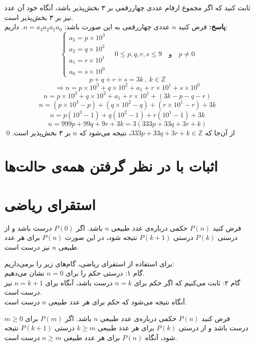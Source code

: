 \begin{example}
	ثابت کنید که اگر مجموع ارقام عددی چهاررقمی بر ۳ بخش‌پذیر باشد، آنگاه خود آن عدد نیز بر ۳ بخش‌پذیر است. \\
	\textbf{پاسخ:}
	فرض کنید $n$ عددی چهاررقمی به این صورت باشد:
	$n = a_3 a_2 a_1 a_0$.
	داریم:
	\[
	\begin{cases}
		a_3 = p \times 10^3 \\
		a_2 = q \times 10^2 \\
		a_1 = r \times 10^1 \\
		a_0 = s \times 10^0
	\end{cases}
	\quad
	0 \leq p, q, r, s \leq 9 \quad \text{و} \quad p \neq 0
	\]
	$$p+q+r+s = 3k \ , \ k \in \mathbb{Z}$$
	$$\Rightarrow n = p \times 10^3 +  q \times 10^2 + a_1 + r \times 10^1 + s \times 10^0$$
	$$n = p \times 10^3 +  q \times 10^2 + a_1 + r \times 10^1 + (3k-p-q-r)$$
	$$n = (p \times 10^3 -p) + (q \times 10^2 -q) + (r \times 10^1 -r) +3k$$
	$$n = p(10^3-1) + q(10^2-1) + r(10^1-1) +3k$$
	$$n = 999p +99q +9r +3k = 3(333p+33q+3r+k)$$
	از آن‌جا که
	$333p+33q+3r+k \in \mathbb{Z}$،
	نتیجه می‌شود که $n$ بر ۳ بخش‌پذیر است.
	\qed
\end{example}

\section{اثبات با در نظر گرفتن همه‌ی حالت‌ها}

\section{استقرای ریاضی}

\begin{theorem}
	فرض کنید
	$P(n)$
	حکمی درباره‌ی عدد طبیعی $n$ باشد. اگر
	$P(0)$
	درست باشد و از درستی
	$P(k)$
	درستی
	$P(k+1)$
	نتیجه شود، در این صورت
	$P(n)$
	برای هر عدد طبیعی $n$ نیز درست است.
\end{theorem}

برای استفاده از استقرای ریاضی، گام‌های زیر را برمی‌داریم: \\
گام ۱: درستی حکم را برای
$n=0$
نشان می‌دهیم. \\
گام ۲: ثابت می‌کنیم که اگر حکم برای
$n=k$
درست باشد، آنگاه برای
$n=k+1$
نیز درست است. \\
آنگاه نتیجه می‌شود که حکم برای هر عدد طبیعی $n$ درست است.

\begin{theorem}
	فرض کنید
	$P(n)$
	حکمی درباره‌ی عدد طبیعی $n$ باشد. اگر
	$P(m)$
	برای
	$m \geq 0$
	درست باشد و از درستی
	$P(k)$
	برای هر عدد طبیعی
	$k \geq m$
	درستی
	$P(k+1)$
	نتیجه شود، آنگاه
	$P(n)$
	برای هر عدد طبیعی
	$n \geq m$
	درست است.
\end{theorem}

